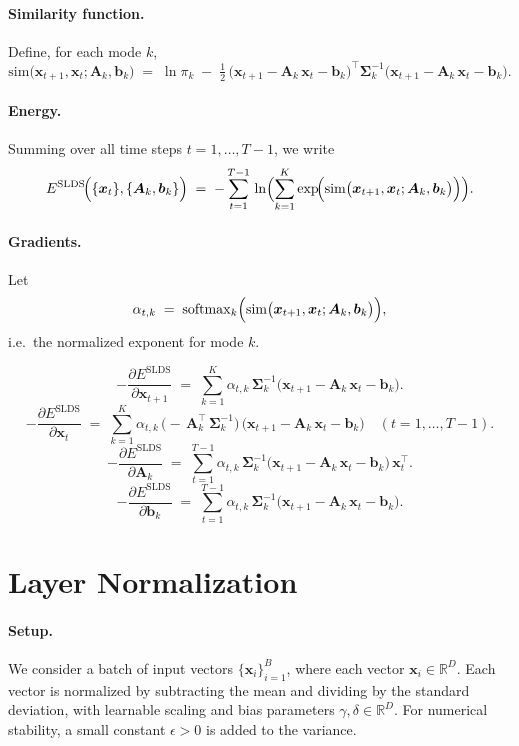 \documentclass{article}
\begin{document}
\paragraph{Similarity function.}
Define, for each mode \(k\),
\[
\mathrm{sim}\bigl(\bm{x}_{t+1}, \bm{x}_t; \bm{A}_k, \bm{b}_k\bigr)
\;=\;
\ln \pi_k
\;-\;
\tfrac12\,\bigl(\bm{x}_{t+1} - \bm{A}_k\,\bm{x}_t - \bm{b}_k\bigr)^\top
\bm{\Sigma}_k^{-1}
\bigl(\bm{x}_{t+1} - \bm{A}_k\,\bm{x}_t - \bm{b}_k\bigr).
\]

\paragraph{Energy.}
Summing over all time steps \(t = 1,\ldots,T-1\), we write
\begin{equation}
E^{\mathrm{SLDS}}\!\Bigl(\{\bm{x}_t\}, \{\bm{A}_k, \bm{b}_k\}\Bigr)
\;=\;
-\sum_{t=1}^{T-1}\,
\ln \Bigl(\sum_{k=1}^K
\exp\!\Bigl(
\mathrm{sim}\bigl(\bm{x}_{t+1}, \bm{x}_t; \bm{A}_k, \bm{b}_k\bigr)
\Bigr)\Bigr).
\end{equation}

\paragraph{Gradients.}
Let 
\[
\alpha_{t,k} 
\;=\;
\mathrm{softmax}_{k}\Bigl(
\mathrm{sim}\bigl(\bm{x}_{t+1}, \bm{x}_t; \bm{A}_k, \bm{b}_k\bigr)\Bigr),
\]
i.e.\ the normalized exponent for mode \(k\).  

\[
-\frac{\partial E^{\mathrm{SLDS}}}{\partial \bm{x}_{t+1}}
\;=\;
\sum_{k=1}^K 
\alpha_{t,k}\,\bm{\Sigma}_k^{-1}
\bigl(\bm{x}_{t+1} - \bm{A}_k\,\bm{x}_t - \bm{b}_k\bigr).
\]
\[
-\frac{\partial E^{\mathrm{SLDS}}}{\partial \bm{x}_t}
\;=\;
\sum_{k=1}^K 
\alpha_{t,k}\,
\bigl(-\,\bm{A}_k^\top\,\bm{\Sigma}_k^{-1}\bigr)\,
\bigl(\bm{x}_{t+1} - \bm{A}_k\,\bm{x}_t - \bm{b}_k\bigr)
\quad (t=1,\dots,T-1).
\]
\[
-\frac{\partial E^{\mathrm{SLDS}}}{\partial \bm{A}_k}
\;=\;
\sum_{t=1}^{T-1}
\alpha_{t,k}\,\bm{\Sigma}_k^{-1}
\bigl(\bm{x}_{t+1} - \bm{A}_k\,\bm{x}_t - \bm{b}_k\bigr)\,\bm{x}_t^\top.
\]
\[
-\frac{\partial E^{\mathrm{SLDS}}}{\partial \bm{b}_k}
\;=\;
\sum_{t=1}^{T-1}
\alpha_{t,k}\,\bm{\Sigma}_k^{-1}
\bigl(\bm{x}_{t+1} - \bm{A}_k\,\bm{x}_t - \bm{b}_k\bigr).
\]

\section{Layer Normalization}

\paragraph{Setup.}
We consider a batch of input vectors \(\{\bm{x}_i\}_{i=1}^B\), where each vector \(\bm{x}_i \in \mathbb{R}^D\). Each vector is normalized by subtracting the mean and dividing by the standard deviation, with learnable scaling and bias parameters \(\gamma, \delta \in \mathbb{R}^D\). For numerical stability, a small constant \(\epsilon > 0\) is added to the variance.
\end{document}
